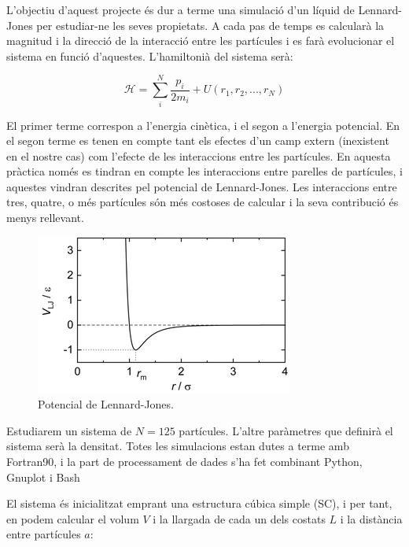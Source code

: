 \documentclass[a4paper,10pt]{article}
\begin{document}
L'objectiu d'aquest projecte és dur a terme una simulació d'un líquid de Lennard-Jones per estudiar-ne les seves propietats. A cada pas de temps es calcularà la magnitud i la direcció de la interacció entre les partícules i es farà evolucionar el sistema en funció d'aquestes. L'hamiltonià del sistema serà:

\begin{equation}
	\mathcal{H} = \sum_{i}^{N} \frac{p_i}{2 m_i} + U(r_1, r_2, ..., r_N)
\end{equation}

El primer terme correspon a l'energia cinètica, i el segon a l'energia potencial. En el segon terme es tenen en compte tant els efectes d'un camp extern (inexistent en el nostre cas) com l'efecte de les interaccions entre les partícules. En aquesta pràctica només es tindran en compte les interaccions entre parelles de partícules, i aquestes vindran descrites pel potencial de Lennard-Jones. Les interaccions entre tres, quatre, o més partícules són més costoses de calcular i la seva contribució és menys rellevant. 

\begin{figure}
	\centering
	\includegraphics[width=0.7\linewidth]{lennard-jones_potential}
	\caption{Potencial de Lennard-Jones.}
	\label{fig:lennard-jonespotential}
\end{figure}




Estudiarem un sistema de $N=125$ partícules. L'altre paràmetres que definirà el sistema serà la densitat. Totes les simulacions estan dutes a terme amb Fortran90, i la part de processament de dades s'ha fet combinant Python, Gnuplot i Bash

El sistema és inicialitzat emprant una estructura cúbica simple (SC), i per tant, en podem calcular el volum $V$ i la llargada de cada un dels costats $L$ i la distància entre partícules $a$:
\end{document}
